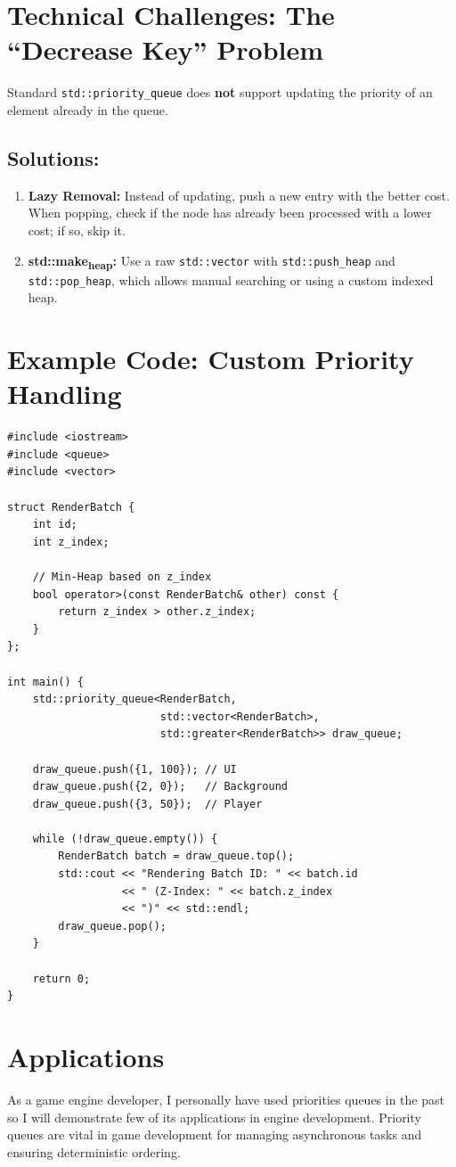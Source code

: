 \documentclass[11pt]{article}
\begin{document}
\section{Technical Challenges: The ``Decrease Key'' Problem}
\label{sec:org380209f}
Standard \texttt{std::priority\_queue} does \textbf{not} support updating the priority of an element already in the queue.
\subsection{Solutions:}
\label{sec:org0703b7a}
\begin{enumerate}
\item \textbf{Lazy Removal:} Instead of updating, push a new entry with the better cost. When popping, check if the node has already been processed with a lower cost; if so, skip it.
\item \textbf{std::make\textsubscript{heap}:} Use a raw \texttt{std::vector} with \texttt{std::push\_heap} and \texttt{std::pop\_heap}, which allows manual searching or using a custom indexed heap.
\end{enumerate}

\newpage
\section{Example Code: Custom Priority Handling}
\label{sec:org09557e4}
\begin{verbatim}
#include <iostream>
#include <queue>
#include <vector>

struct RenderBatch {
    int id;
    int z_index;

    // Min-Heap based on z_index
    bool operator>(const RenderBatch& other) const {
        return z_index > other.z_index;
    }
};

int main() {
    std::priority_queue<RenderBatch,
                        std::vector<RenderBatch>,
                        std::greater<RenderBatch>> draw_queue;

    draw_queue.push({1, 100}); // UI
    draw_queue.push({2, 0});   // Background
    draw_queue.push({3, 50});  // Player

    while (!draw_queue.empty()) {
        RenderBatch batch = draw_queue.top();
        std::cout << "Rendering Batch ID: " << batch.id
                  << " (Z-Index: " << batch.z_index
                  << ")" << std::endl;
        draw_queue.pop();
    }

    return 0;
}
\end{verbatim}
\section{Applications}
\label{sec:org7c0f805}
As a game engine developer, I personally have used priorities queues in the past so I will demonstrate few of its applications in engine development.
Priority queues are vital in game development for managing asynchronous tasks and ensuring deterministic ordering.
\end{document}
